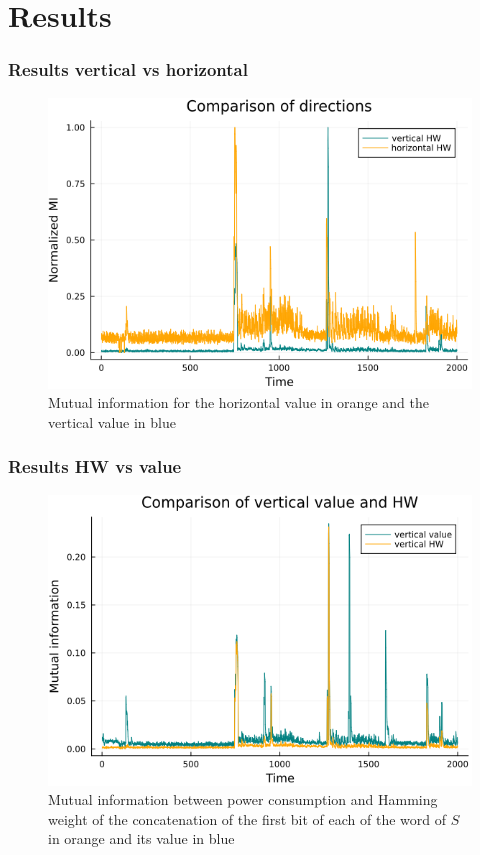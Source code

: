 \documentclass{beamer}
\begin{document}
	\section{Results}
	\begin{frame}
		\frametitle{Results vertical vs horizontal}
		\begin{figure}[h]
			\centering
			\includegraphics[scale=0.3]{h_and_v_one_byte}
			\caption{Mutual information for the horizontal value in orange and the vertical value in blue}
			\label{hvval}
		\end{figure}
	\end{frame}
	
	\begin{frame}
		\frametitle{Results HW vs value}
		\begin{figure}
			\centering
			\includegraphics[scale=0.3]{vertical_one_bit}
			\caption{Mutual information between power consumption and Hamming weight of the concatenation of the first bit of each of the word of $S$ in orange and its value in blue}
			\label{vHW}
		\end{figure}
	\end{frame}
	
\end{document}
